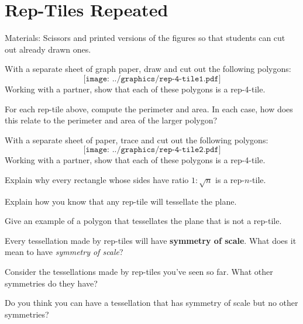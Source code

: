 \newpage
\section{Rep-Tiles Repeated}

\begin{teachingnote}
Materials:  Scissors and printed versions of the figures so that students can cut out already drawn ones.   
\end{teachingnote}

\begin{prob}
With a separate sheet of graph paper, draw and cut out the following polygons:
\[
\texttt{[image: ../graphics/rep-4-tile1.pdf]}
\]
Working with a partner, show that each of these polygons is a rep-4-tile.
\end{prob}

\begin{prob}
For each rep-tile above, compute the perimeter and area. In each case,
how does this relate to the perimeter and area of the larger polygon?
\end{prob}


\begin{prob}
With a separate sheet of paper, trace and cut out the following
polygons:
\[
\texttt{[image: ../graphics/rep-4-tile2.pdf]}
\]
Working with a partner, show that each of these polygons is a rep-4-tile.
\end{prob}


\begin{prob}
Explain why every rectangle whose sides have ratio $1:\sqrt{n}$ is a
rep-$n$-tile.
\end{prob}

\begin{prob}
Explain how you know that any rep-tile will tessellate the plane.
\end{prob}
\begin{prob}
Give an example of a polygon that tessellates the plane that is not a
rep-tile.
\end{prob}


\begin{prob}
Every tessellation made by rep-tiles will have \textbf{symmetry of scale}. What does it mean to have \textit{symmetry of scale}?
\end{prob}

\begin{prob}
Consider the tessellations made by rep-tiles you've seen so far. What
other symmetries do they have?
\end{prob}

\begin{prob}
Do you think you can have a tessellation that has symmetry of scale
but no other symmetries?
\end{prob}
